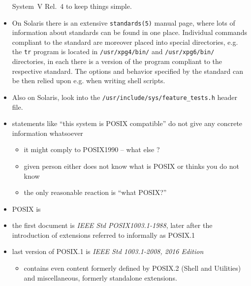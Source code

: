 \begin{itemize}
System~V Rel.~4 to keep things simple.
\item On Solaris there is an extensive \texttt{standards(5)} manual page, where
lots of information about standards can be found in one place.
Individual commands compliant to the standard are moreover placed
into special directories, e.g. the \texttt{tr} program is located in
\texttt{/usr/xpg4/bin/} and \texttt{/usr/xpg6/bin/} directories, in each there
is a version of the program compliant to the respective standard.
The options and behavior specified by the standard can be then relied upon e.g.
when writing shell scripts.
\item Also on Solaris, look into the
\texttt{/usr/inc{}lude/sys/fea\-ture\-\_tests.h} header file.
\end{itemize}



\begin{slide}
\begin{itemize}
\renewcommand{\baselinestretch}{0.8}
\item statements like ``this system is POSIX compatible'' do not give any
concrete information whatsoever
\begin{itemize}
\item it might comply to POSIX1990 -- what else ?
\item given person either does not know what is POSIX or thinks you do not know
\item the only reasonable reaction is ``what POSIX?''
\end{itemize}
\item POSIX is 
\item the first document is \emph{IEEE Std POSIX1003.1-1988}, later after the
introduction of extensions referred to informally as POSIX.1
\item last version of POSIX.1 is \emph{IEEE Std 1003.1-2008, 2016 Edition}
\begin{itemize}
\item contains even content formerly defined by POSIX.2 (Shell and Utilities)
and miscellaneous, formerly standalone extensions.
\end{itemize}
\end{itemize}
\end{slide}

\label{POSIX}

